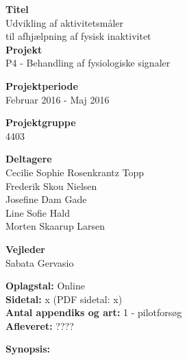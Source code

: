 \begin{minipage}[t]{0.48\textwidth}
\textbf{Titel} \\[5pt]\hspace*{2ex} 
Udvikling af aktivitetsmåler\\\hspace*{2ex}
til afhjælpning af fysisk inaktivitet\\


\textbf{Projekt} \\[5pt]\hspace*{2ex} 
P4 - Behandling af fysiologiske signaler\\\hspace*{2ex}


\textbf{Projektperiode} \\[5pt]\bigskip\hspace{2ex}
Februar 2016 - Maj 2016

\textbf{Projektgruppe} \\[5pt]\bigskip\hspace{2ex}
4403

\textbf{Deltagere} \\[5pt]\hspace*{2ex}
Cecilie Sophie Rosenkrantz Topp \\\hspace*{2ex}
Frederik Skou Nielsen \\\hspace*{2ex}
Josefine Dam Gade \\\hspace*{2ex}
Line Sofie Hald \\\hspace*{2ex}
Morten Skaarup Larsen \\\bigskip\hspace{2ex}


\textbf{Vejleder} \\[5pt]\hspace*{2ex}
Sabata Gervasio \\\bigskip\hspace{2ex}


\vspace*{1cm}

\textbf{Oplagstal:} Online \\
\textbf{Sidetal:} x (PDF sidetal: x) \\
\textbf{Antal appendiks og art:} 1 - pilotforsøg \\ 
\textbf{Afleveret:} ????

\end{minipage}
\hfill
\begin{minipage}[t]{0.483\textwidth}
\textbf{Synopsis:} \\[5pt]
\fbox{\parbox{7cm}{\bigskip\bigskip}}
\end{minipage}

